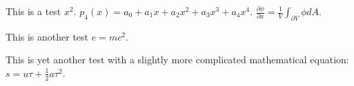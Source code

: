 \documentclass[border=0bp,varwidth]{standalone}
\begin{document}
This is a test $x^2$. $p_4(x) = a_0 + a_1x + a_2x^2 + a_3x^3 + a_4x^4$. $\frac{\partial\phi}{\partial x} = \frac{1}{V}\int_{\partial V} \phi dA$.

This is another test $e = mc^2$.

This is yet another test with a slightly more complicated mathematical equation: $s = u\tau + \frac{1}{2}a\tau^2$.
\end{document}
